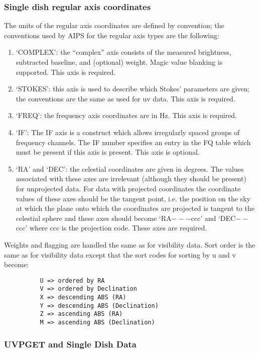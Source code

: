 \subsubsection{Single dish regular axis coordinates }
The units of the regular axis coordinates are defined by convention;
the conventions used by AIPS for the regular axis types are the following:
\begin{enumerate} %
\item `COMPLEX': the ``complex'' axis consists of the measured
brightness, subtracted baseline, and (optional) weight.  Magic value
blanking is supported.  This axis is required.
\item `STOKES': this axis is used to describe which Stokes' parameters are
given; the conventions are the same as used for uv data.  This axis is
required.
\item `FREQ': the frequency axis coordinates are in Hz.  This axis is required.
\item `IF': The IF axis is a construct which allows irregularly spaced groups
of frequency channels.  The IF number specifies an entry in the
FQ table which must be present if this axis is present. This axis is
optional.
\item `RA' and `DEC': the celestial coordinates are given in degrees.  The
values associated with these axes are irrelevant (although they should
be present) for unprojected data.  For data with projected coordinates
the coordinate values of these axes should be the tangent point, i.e.
the position on the sky at which the plane onto which the coordinates
are projected is tangent to the celestial sphere and these axes should
become `RA$---$ccc' and `DEC$--$ccc' where ccc is the projection code.
These axes are required.

\end{enumerate} %
     Weights and flagging are handled the same as for visibility data.
Sort order is the same as for visibility data except that the sort
codes for sorting by u and v become:
\begin{verbatim}
          U => ordered by RA
          V => ordered by Declination
          X => descending ABS (RA)
          Y => descending ABS (Declination)
          Z => ascending ABS (RA)
          M => ascending ABS (Declination)
\end{verbatim}
\subsubsection{UVPGET and Single Dish Data}

